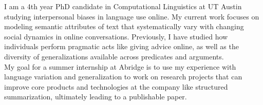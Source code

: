 I am a 4th year PhD candidate in Computational Linguistics at UT Austin studying interpersonal biases in language use online. My current work focuses on modeling semantic attributes of text that systematically vary with changing social dynamics in online conversations. Previously, I have studied how individuals perform pragmatic acts like giving advice online, as well as the diversity of generalizations available across predicates and arguments.\\
My goal for a summer internship at Abridge is to use my experience with language variation and generalization to work on research projects that can improve core products and technologies at the company like structured summarization, ultimately leading to a publishable paper.
